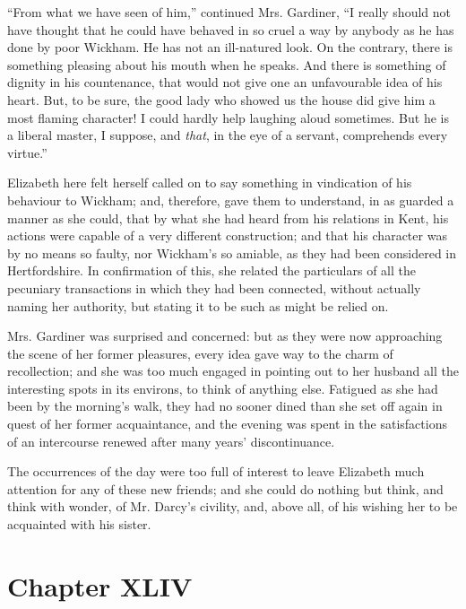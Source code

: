 \documentclass[12pt,openright]{book}
\begin{document}
“From what we have seen of him,” continued Mrs. Gardiner, “I really should not have thought that he could have behaved in so cruel a way by anybody as he has done by poor Wickham. He has not an ill-natured look. On the contrary, there is something pleasing about his mouth when he speaks. And there is something of dignity in his countenance, that would not give one an unfavourable idea of his heart. But, to be sure, the good lady who showed us the house did give him a most flaming character! I could hardly help laughing aloud sometimes. But he is a liberal master, I suppose, and \textit{that}, in the eye of a servant, comprehends every virtue.”

Elizabeth here felt herself called on to say something in vindication of his behaviour to Wickham; and, therefore, gave them to understand, in as guarded a manner as she could, that by what she had heard from his relations in Kent, his actions were capable of a very different construction; and that his character was by no means so faulty, nor Wickham’s so amiable, as they had been considered in Hertfordshire. In confirmation of this, she related the particulars of all the pecuniary transactions in which they had been connected, without actually naming her authority, but stating it to be such as might be relied on.

Mrs. Gardiner was surprised and concerned: but as they were now approaching the scene of her former pleasures, every idea gave way to the charm of recollection; and she was too much engaged in pointing out to her husband all the interesting spots in its environs, to think of anything else. Fatigued as she had been by the morning’s walk, they had no sooner dined than she set off again in quest of her former acquaintance, and the evening was spent in the satisfactions of an intercourse renewed after many years’ discontinuance.

The occurrences of the day were too full of interest to leave Elizabeth much attention for any of these new friends; and she could do nothing but think, and think with wonder, of Mr. Darcy’s civility, and, above all, of his wishing her to be acquainted with his sister.

\chapter{Chapter XLIV}
\end{document}
